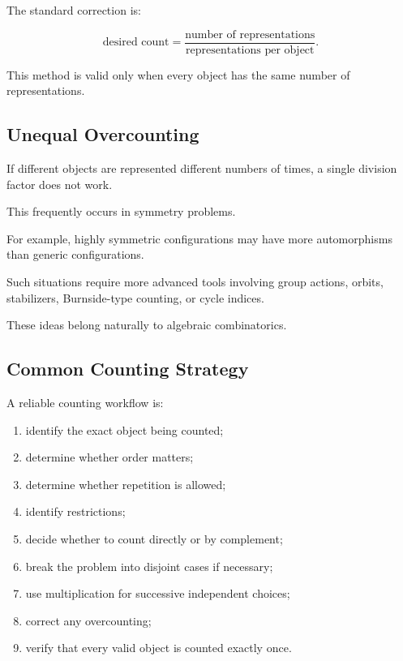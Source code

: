 The standard correction is:

\[
\boxed{
\text{desired count}
=
\frac{\text{number of representations}}
{\text{representations per object}}.
}
\]

This method is valid only when every object has the same number of
representations.

\subsection{Unequal Overcounting}
\label{subsec:unequal-overcounting}

If different objects are represented different numbers of times, a
single division factor does not work.

This frequently occurs in symmetry problems.

For example, highly symmetric configurations may have more
automorphisms than generic configurations.

Such situations require more advanced tools involving group actions,
orbits, stabilizers, Burnside-type counting, or cycle indices.

These ideas belong naturally to algebraic combinatorics.

\subsection{Common Counting Strategy}
\label{subsec:common-counting-strategy}

A reliable counting workflow is:

\begin{enumerate}
    \item identify the exact object being counted;
    \item determine whether order matters;
    \item determine whether repetition is allowed;
    \item identify restrictions;
    \item decide whether to count directly or by complement;
    \item break the problem into disjoint cases if necessary;
    \item use multiplication for successive independent choices;
    \item correct any overcounting;
    \item verify that every valid object is counted exactly once.
\end{enumerate}

